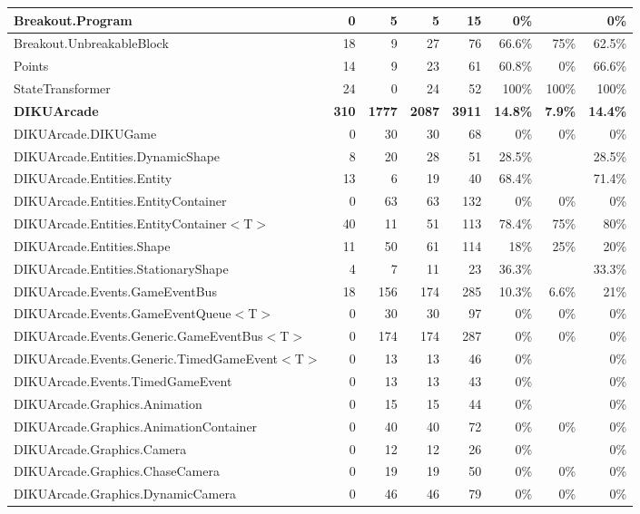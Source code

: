 \documentclass[a4paper,landscape,10pt]{article}
\begin{document}
\begin{longtable}[l]{|l|r|r|r|r|r|r|r|}
\hline
Breakout.Program & 0 & 5 & 5 & 15 & 0\% &  & 0\%\\
\hline
Breakout.UnbreakableBlock & 18 & 9 & 27 & 76 & 66.6\% & 75\% & 62.5\%\\
\hline
Points & 14 & 9 & 23 & 61 & 60.8\% & 0\% & 66.6\%\\
\hline
StateTransformer & 24 & 0 & 24 & 52 & 100\% & 100\% & 100\%\\
\hline
\textbf{DIKUArcade} & \textbf{310} & \textbf{1777} & \textbf{2087} & \textbf{3911} & \textbf{14.8\%} & \textbf{7.9\%} & \textbf{14.4\%}\\
\hline
DIKUArcade.DIKUGame & 0 & 30 & 30 & 68 & 0\% & 0\% & 0\%\\
\hline
DIKUArcade.Entities.DynamicShape & 8 & 20 & 28 & 51 & 28.5\% &  & 28.5\%\\
\hline
DIKUArcade.Entities.Entity & 13 & 6 & 19 & 40 & 68.4\% &  & 71.4\%\\
\hline
DIKUArcade.Entities.EntityContainer & 0 & 63 & 63 & 132 & 0\% & 0\% & 0\%\\
\hline
DIKUArcade.Entities.EntityContainer$<$T$>$ & 40 & 11 & 51 & 113 & 78.4\% & 75\% & 80\%\\
\hline
DIKUArcade.Entities.Shape & 11 & 50 & 61 & 114 & 18\% & 25\% & 20\%\\
\hline
DIKUArcade.Entities.StationaryShape & 4 & 7 & 11 & 23 & 36.3\% &  & 33.3\%\\
\hline
DIKUArcade.Events.GameEventBus & 18 & 156 & 174 & 285 & 10.3\% & 6.6\% & 21\%\\
\hline
DIKUArcade.Events.GameEventQueue$<$T$>$ & 0 & 30 & 30 & 97 & 0\% & 0\% & 0\%\\
\hline
DIKUArcade.Events.Generic.GameEventBus$<$T$>$ & 0 & 174 & 174 & 287 & 0\% & 0\% & 0\%\\
\hline
DIKUArcade.Events.Generic.TimedGameEvent$<$T$>$ & 0 & 13 & 13 & 46 & 0\% &  & 0\%\\
\hline
DIKUArcade.Events.TimedGameEvent & 0 & 13 & 13 & 43 & 0\% &  & 0\%\\
\hline
DIKUArcade.Graphics.Animation & 0 & 15 & 15 & 44 & 0\% &  & 0\%\\
\hline
DIKUArcade.Graphics.AnimationContainer & 0 & 40 & 40 & 72 & 0\% & 0\% & 0\%\\
\hline
DIKUArcade.Graphics.Camera & 0 & 12 & 12 & 26 & 0\% &  & 0\%\\
\hline
DIKUArcade.Graphics.ChaseCamera & 0 & 19 & 19 & 50 & 0\% & 0\% & 0\%\\
\hline
DIKUArcade.Graphics.DynamicCamera & 0 & 46 & 46 & 79 & 0\% & 0\% & 0\%\\

\end{longtable}
\end{document}
